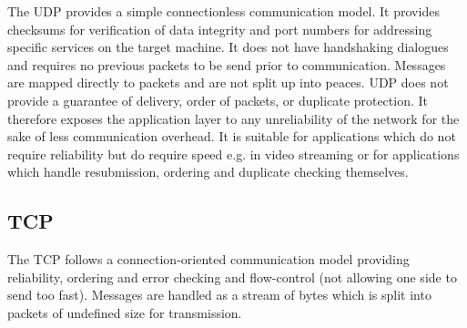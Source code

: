 The \ac{UDP} provides a simple connectionless communication model. It provides checksums for verification of data integrity and port numbers for addressing specific services on the target machine. It does not have handshaking dialogues and requires no previous packets to be send prior to communication. Messages are mapped directly to packets and are not split up into peaces. \ac{UDP} does not provide a guarantee of delivery, order of packets, or duplicate protection. It therefore exposes the application layer to any unreliability of the network for the sake of less communication overhead. It is suitable for applications which do not require reliability but do require speed e.g. in video streaming or for applications which handle resubmission, ordering and duplicate checking themselves.

\subsection{TCP}

The \ac{TCP} follows a connection-oriented communication model providing reliability, ordering and error checking and flow-control (not allowing one side to send too fast). Messages are handled as a stream of bytes which is split into packets of undefined size for transmission.

